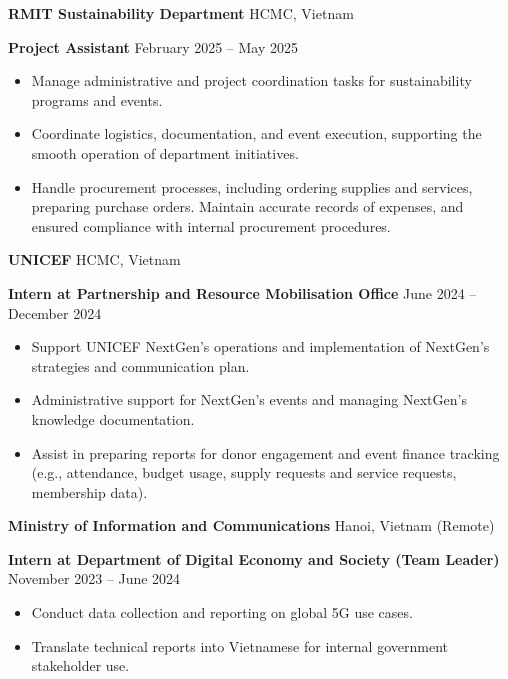 \documentclass[10pt]{article}
\begin{document}
\textbf{RMIT Sustainability Department} \hfill HCMC, Vietnam

\textbf{Project Assistant} \hfill February 2025 – May 2025
\begin{itemize}[noitemsep, topsep=0pt, partopsep=0pt, parsep=0pt]
    \item Manage administrative and project coordination tasks for sustainability programs and events.
    \item Coordinate logistics, documentation, and event execution, supporting the smooth operation of department initiatives.
    \item Handle procurement processes, including ordering supplies and services, preparing purchase orders. Maintain accurate records of expenses, and ensured compliance with internal procurement procedures.
\end{itemize}
\vspace{12pt}
\textbf{UNICEF} \hfill HCMC, Vietnam

\textbf{Intern at Partnership and Resource Mobilisation Office} \hfill June 2024 – December 2024
\begin{itemize}[noitemsep, topsep=0pt, partopsep=0pt, parsep=0pt]
    \item Support UNICEF NextGen's operations and implementation of NextGen’s strategies and communication plan.
    \item Administrative support for NextGen’s events and managing NextGen’s knowledge documentation.
    \item Assist in preparing reports for donor engagement and event finance tracking (e.g., attendance, budget usage, supply requests and service requests, membership data).
\end{itemize}

\vspace{12pt}

\textbf{Ministry of Information and Communications} \hfill Hanoi, Vietnam (Remote)

\textbf{Intern at Department of Digital Economy and Society (Team Leader)} \hfill November 2023 – June 2024
\begin{itemize}[noitemsep, topsep=0pt, partopsep=0pt, parsep=0pt]
    \item Conduct data collection and reporting on global 5G use cases.
    \item Translate technical reports into Vietnamese for internal government stakeholder use.
\end{itemize}
\vspace{12pt}
\end{document}
